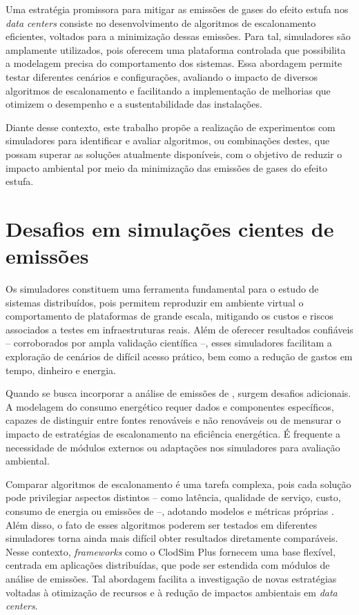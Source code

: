 \documentclass[12pt]{article}
\begin{document}
Uma estratégia promissora para mitigar as emissões de gases do efeito estufa nos \textit{data centers} consiste no desenvolvimento de algoritmos de escalonamento eficientes, voltados para a minimização dessas emissões. Para tal, simuladores são amplamente utilizados, pois oferecem uma plataforma controlada que possibilita a modelagem precisa do comportamento dos sistemas. Essa abordagem permite testar diferentes cenários e configurações, avaliando o impacto de diversos algoritmos de escalonamento e facilitando a implementação de melhorias que otimizem o desempenho e a sustentabilidade das instalações.

Diante desse contexto, este trabalho propõe a realização de experimentos com simuladores para identificar e avaliar algoritmos, ou combinações destes, que possam superar as soluções atualmente disponíveis, com o objetivo de reduzir o impacto ambiental por meio da minimização das emissões de gases do efeito estufa.

\section{Desafios em simulações cientes de emissões} \label{sec:firstpage}

Os simuladores constituem uma ferramenta fundamental para o estudo de sistemas distribuídos, pois permitem reproduzir em ambiente virtual o comportamento de plataformas de grande escala, mitigando os custos e riscos associados a testes em infraestruturas reais. Além de oferecer resultados confiáveis -- corroborados por ampla validação científica --, esses simuladores facilitam a exploração de cenários de difícil acesso prático, bem como a redução de gastos em tempo, dinheiro e energia.

Quando se busca incorporar a análise de emissões de , surgem desafios adicionais. A modelagem do consumo energético requer dados e componentes específicos, capazes de distinguir entre fontes renováveis e não renováveis ou de mensurar o impacto de estratégias de escalonamento na eficiência energética. É frequente a necessidade de módulos externos ou adaptações nos simuladores para avaliação ambiental.

Comparar algoritmos de escalonamento é uma tarefa complexa, pois cada solução pode privilegiar aspectos distintos -- como latência, qualidade de serviço, custo, consumo de energia ou emissões de  --, adotando modelos e métricas próprias \cite{kumar:19}. Além disso, o fato de esses algoritmos poderem ser testados em diferentes simuladores torna ainda mais difícil obter resultados diretamente comparáveis. Nesse contexto, \textit{frameworks} como o ClodSim Plus \cite{silva:17} fornecem uma base flexível, centrada em aplicações distribuídas, que pode ser estendida com módulos de análise de emissões. Tal abordagem facilita a investigação de novas estratégias voltadas à otimização de recursos e à redução de impactos ambientais em \textit{data centers}.
\end{document}
